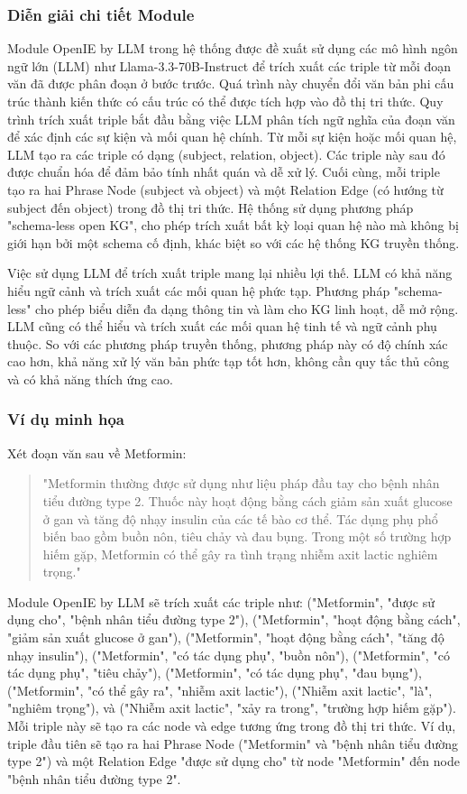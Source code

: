 \subsubsection{Diễn giải chi tiết Module}
Module OpenIE by LLM trong hệ thống được đề xuất sử dụng các mô hình ngôn ngữ lớn (LLM) như Llama-3.3-70B-Instruct để trích xuất các triple từ mỗi đoạn văn đã được phân đoạn ở bước trước. Quá trình này chuyển đổi văn bản phi cấu trúc thành kiến thức có cấu trúc có thể được tích hợp vào đồ thị tri thức. Quy trình trích xuất triple bắt đầu bằng việc LLM phân tích ngữ nghĩa của đoạn văn để xác định các sự kiện và mối quan hệ chính. Từ mỗi sự kiện hoặc mối quan hệ, LLM tạo ra các triple có dạng (subject, relation, object). Các triple này sau đó được chuẩn hóa để đảm bảo tính nhất quán và dễ xử lý. Cuối cùng, mỗi triple tạo ra hai Phrase Node (subject và object) và một Relation Edge (có hướng từ subject đến object) trong đồ thị tri thức. Hệ thống sử dụng phương pháp "schema-less open KG", cho phép trích xuất bất kỳ loại quan hệ nào mà không bị giới hạn bởi một schema cố định, khác biệt so với các hệ thống KG truyền thống.

Việc sử dụng LLM để trích xuất triple mang lại nhiều lợi thế. LLM có khả năng hiểu ngữ cảnh và trích xuất các mối quan hệ phức tạp. Phương pháp "schema-less" cho phép biểu diễn đa dạng thông tin và làm cho KG linh hoạt, dễ mở rộng. LLM cũng có thể hiểu và trích xuất các mối quan hệ tinh tế và ngữ cảnh phụ thuộc. So với các phương pháp truyền thống, phương pháp này có độ chính xác cao hơn, khả năng xử lý văn bản phức tạp tốt hơn, không cần quy tắc thủ công và có khả năng thích ứng cao.

\subsubsection{Ví dụ minh họa}
Xét đoạn văn sau về Metformin:

\begin{quote}
"Metformin thường được sử dụng như liệu pháp đầu tay cho bệnh nhân tiểu đường type 2. Thuốc này hoạt động bằng cách giảm sản xuất glucose ở gan và tăng độ nhạy insulin của các tế bào cơ thể. Tác dụng phụ phổ biến bao gồm buồn nôn, tiêu chảy và đau bụng. Trong một số trường hợp hiếm gặp, Metformin có thể gây ra tình trạng nhiễm axit lactic nghiêm trọng."
\end{quote}

Module OpenIE by LLM sẽ trích xuất các triple như: ("Metformin", "được sử dụng cho", "bệnh nhân tiểu đường type 2"), ("Metformin", "hoạt động bằng cách", "giảm sản xuất glucose ở gan"), ("Metformin", "hoạt động bằng cách", "tăng độ nhạy insulin"), ("Metformin", "có tác dụng phụ", "buồn nôn"), ("Metformin", "có tác dụng phụ", "tiêu chảy"), ("Metformin", "có tác dụng phụ", "đau bụng"), ("Metformin", "có thể gây ra", "nhiễm axit lactic"), ("Nhiễm axit lactic", "là", "nghiêm trọng"), và ("Nhiễm axit lactic", "xảy ra trong", "trường hợp hiếm gặp"). Mỗi triple này sẽ tạo ra các node và edge tương ứng trong đồ thị tri thức. Ví dụ, triple đầu tiên sẽ tạo ra hai Phrase Node ("Metformin" và "bệnh nhân tiểu đường type 2") và một Relation Edge "được sử dụng cho" từ node "Metformin" đến node "bệnh nhân tiểu đường type 2".

